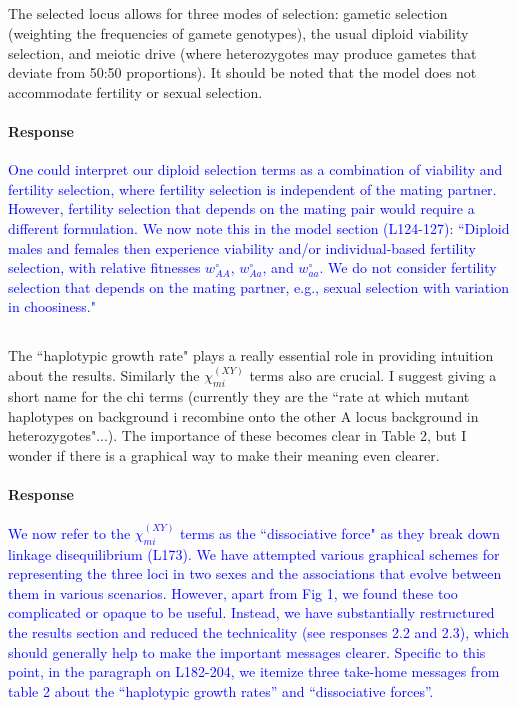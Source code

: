 \documentclass[10pt,letterpaper]{article}
\begin{document}
\noindent\subsection{}
The selected locus allows for three modes of selection: gametic selection (weighting the frequencies of gamete genotypes), the usual diploid viability selection, and meiotic drive (where heterozygotes may produce gametes that deviate from 50:50 proportions).  It should be noted that the model does not accommodate fertility or sexual selection.

\noindent\paragraph{Response}
\textcolor{blue}{
One could interpret our diploid selection terms as a combination of viability and fertility selection, where fertility selection is independent of the mating partner.
However, fertility selection that depends on the mating pair would require a different formulation.
We now note this in the model section (L124-127):
``Diploid males and females then experience viability and/or individual-based fertility selection, with relative fitnesses $w_{AA}^{\circ}$, $w_{Aa}^{\circ}$, and $w_{aa}^{\circ}$.
We do not consider fertility selection that depends on the mating partner, e.g., sexual selection with variation in choosiness."
}

\noindent\subsection{}
The ``haplotypic growth rate" plays a really essential role in providing intuition about the results. Similarly the $\chi_{mi}^{(XY)}$ terms also are crucial.  I suggest giving a short name for the chi terms (currently they are the ``rate at which mutant haplotypes on background i recombine onto the other A locus background in heterozygotes"...).   The importance of these becomes clear in Table 2, but I wonder if there is a graphical way to make their meaning even clearer.  

\noindent\paragraph{Response}
\textcolor{blue}{
We now refer to the $\chi_{mi}^{(XY)}$ terms as the ``dissociative force" as they break down linkage disequilibrium (L173). 
We have attempted various graphical schemes for representing the three loci in two sexes and the associations that evolve between them in various scenarios. 
However, apart from Fig 1, we found these too complicated or opaque to be useful. 
Instead, we have substantially restructured the results section and reduced the technicality (see responses 2.2 and 2.3), which should generally help to make the important messages clearer. 
Specific to this point, in the paragraph on L182-204, we itemize three take-home messages from table 2 about the ``haplotypic growth rates'' and ``dissociative forces''. 
}
\end{document}
